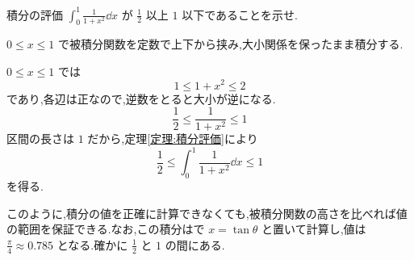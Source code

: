 \begin{example}{積分の評価}
$\int_0^1\frac1{1+x^2}\dd x$ が $\frac12$ 以上 $1$ 以下であることを示せ.
\end{example}
$0\le x\le1$ で被積分関数を定数で上下から挟み,大小関係を保ったまま積分する.

$0\le x\le1$ では
\[
 1\le1+x^2\le2
\]
であり,各辺は正なので,逆数をとると大小が逆になる.
\[
 \frac12\le\frac1{1+x^2}\le1
\]
区間の長さは $1$ だから,定理\ref{定理:積分評価}により
\[
 \frac12\le\int_0^1\frac1{1+x^2}\dd x\le1
\]
を得る.

このように,積分の値を正確に計算できなくても,被積分関数の高さを比べれば値の範囲を保証できる.なお,この積分はで $x=\tan\theta$ と置いて計算し,値は $\frac\pi4\approx0.785$ となる.確かに $\frac12$ と $1$ の間にある.

%

